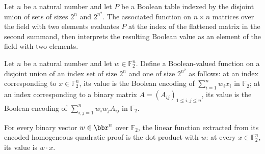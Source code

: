 \begin{definition}
\label{FABL.quadraticMatrixProofFunction}
\leanok
{}
Let $n$ be a natural number and let $P$ be a Boolean table indexed by the disjoint union
of sets of sizes $2^n$ and $2^{n^2}$. The associated function on $n\times n$ matrices
over the field with two elements evaluates $P$ at the index of the flattened matrix in
the second summand, then interprets the resulting Boolean value as an element of the
field with two elements.
\end{definition}

\begin{definition}
\label{FABL.encodeHomogeneousQuadraticProof}
\leanok
{}
Let $n$ be a natural number and let $w\in\mathbb{F}_2^n$. Define a Boolean-valued
function on a disjoint union of an index set of size $2^n$ and one of size $2^{n^2}$ as
follows: at an index corresponding to $x\in\mathbb{F}_2^n$, its value is the Boolean
encoding of $\sum_{i=1}^n w_i x_i$ in $\mathbb{F}_2$; at an index corresponding to a
binary matrix $A=(A_{ij})_{1\le i,j\le n}$, its value is the Boolean encoding of
$\sum_{i,j=1}^n w_iw_jA_{ij}$ in $\mathbb{F}_2$.
\end{definition}

\begin{theorem}
\label{FABL.quadraticLinearProofFunction_encodeHomogeneousQuadraticProof}
\leanok
{}
For every binary vector $w\in\bbr^n$ over $\mathbb{F}_2$, the linear function extracted
from its encoded homogeneous quadratic proof is the dot product with $w$: at every
$x\in\mathbb{F}_2^n$, its value is $w\cdot x$.
\end{theorem}

